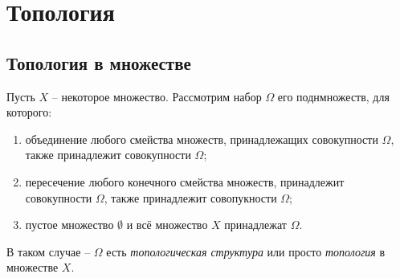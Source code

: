 \chapter{Топология}
\section{Топология в множестве}
Пусть $X$ -- некоторое множество. Рассмотрим набор $\Omega$ его
поднмножеств, для которого:
\begin{enumerate}[noitemsep,label=(\arabic*)]
\item объединение любого смейства множеств, принадлежащих
  совокупности $\Omega$, также принадлежит совокупности $\Omega$;
\item пересечение любого конечного смейства множеств, принадлежит
  совокупности $\Omega$, также принадлежит совопукности $\Omega$;
\item пустое множество $\emptyset$ и всё множество $X$
  принадлежат $\Omega$.
\end{enumerate}
В таком случае -- $\Omega$ есть \emph{топологическая структура}
или просто \emph{топология} в множестве $X$.



